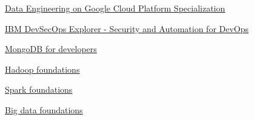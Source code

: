%
%
%


\begin{coursework}
        {\href{https://www.coursera.org/account/accomplishments/specialization/certificate/3MKRH4BJ5MKQ}
        {\underline{Data Engineering on Google Cloud Platform Specialization}}}




        {\href{https://www.credly.com/badges/c8708073-0350-4599-8285-fb6af65a12ea}
        {\underline{IBM DevSecOps Explorer - Security and Automation for DevOps}}}



        {\href{https://university.mongodb.com/course_completion/30f19185172f43e58ae4a0cd9ce13ff0}
        {\underline{MongoDB for developers}}}

        {\href{https://www.youracclaim.com/badges/714d2307-3169-496f-a521-17aeb790f099/public_url}
        {\underline{Hadoop foundations}}}

        {\href{https://www.youracclaim.com/badges/c11a6bc7-ee82-42e6-b9d3-b21c08d68d60/public_url}
        {\underline{Spark foundations}}}

        {\href{https://www.youracclaim.com/badges/fb7b0207-6a42-49fc-bf3e-48d139e150c6/public_url}
        {\underline{Big data foundations}}}


\end{coursework}

